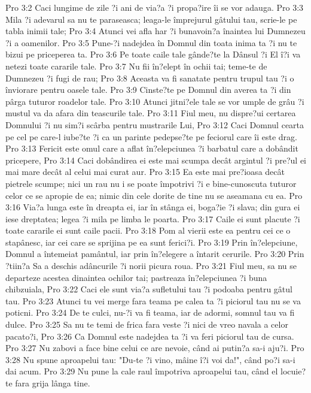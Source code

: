 Pro 3:2  Caci lungime de zile ?i ani de via?a ?i propa?ire îi se vor adauga.
Pro 3:3  Mila ?i adevarul sa nu te paraseasca; leaga-le împrejurul gâtului tau, scrie-le pe tabla inimii tale;
Pro 3:4  Atunci vei afla har ?i bunavoin?a înaintea lui Dumnezeu ?i a oamenilor.
Pro 3:5  Pune-?i nadejdea în Domnul din toata inima ta ?i nu te bizui pe priceperea ta.
Pro 3:6  Pe toate caile tale gânde?te la Dânsul ?i El î?i va netezi toate cararile tale.
Pro 3:7  Nu fii în?elept în ochii tai; teme-te de Dumnezeu ?i fugi de rau;
Pro 3:8  Aceasta va fi sanatate pentru trupul tau ?i o înviorare pentru oasele tale.
Pro 3:9  Cinste?te pe Domnul din averea ta ?i din pârga tuturor roadelor tale.
Pro 3:10  Atunci jitni?ele tale se vor umple de grâu ?i mustul va da afara din teascurile tale.
Pro 3:11  Fiul meu, nu dispre?ui certarea Domnului ?i nu sim?i scârba pentru mustrarile Lui,
Pro 3:12  Caci Domnul cearta pe cel pe care-l iube?te ?i ca un parinte pedepse?te pe feciorul care îi este drag.
Pro 3:13  Fericit este omul care a aflat în?elepciunea ?i barbatul care a dobândit pricepere,
Pro 3:14  Caci dobândirea ei este mai scumpa decât argintul ?i pre?ul ei mai mare decât al celui mai curat aur.
Pro 3:15  Ea este mai pre?ioasa decât pietrele scumpe; nici un rau nu i se poate împotrivi ?i e bine-cunoscuta tuturor celor ce se apropie de ea; nimic din cele dorite de tine nu se aseamana cu ea.
Pro 3:16  Via?a lunga este în dreapta ei, iar în stânga ei, boga?ie ?i slava; din gura ei iese dreptatea; legea ?i mila pe limba le poarta.
Pro 3:17  Caile ei sunt placute ?i toate cararile ei sunt caile pacii.
Pro 3:18  Pom al vierii este ea pentru cei ce o stapânesc, iar cei care se sprijina pe ea sunt ferici?i.
Pro 3:19  Prin în?elepciune, Domnul a întemeiat pamântul, iar prin în?elegere a întarit cerurile.
Pro 3:20  Prin ?tiin?a Sa a deschis adâncurile ?i norii picura roua.
Pro 3:21  Fiul meu, sa nu se departeze acestea dinaintea ochilor tai; pastreaza în?elepciunea ?i buna chibzuiala,
Pro 3:22  Caci ele sunt via?a sufletului tau ?i podoaba pentru gâtul tau.
Pro 3:23  Atunci tu vei merge fara teama pe calea ta ?i piciorul tau nu se va poticni.
Pro 3:24  De te culci, nu-?i va fi teama, iar de adormi, somnul tau va fi dulce.
Pro 3:25  Sa nu te temi de frica fara veste ?i nici de vreo navala a celor pacato?i,
Pro 3:26  Ca Domnul este nadejdea ta ?i va feri piciorul tau de cursa.
Pro 3:27  Nu zabovi a face bine celui ce are nevoie, când ai putin?a sa-i aju?i.
Pro 3:28  Nu spune aproapelui tau: "Du-te ?i vino, mâine î?i voi da!", când po?i sa-i dai acum.
Pro 3:29  Nu pune la cale raul împotriva aproapelui tau, când el locuie?te fara grija lânga tine.
